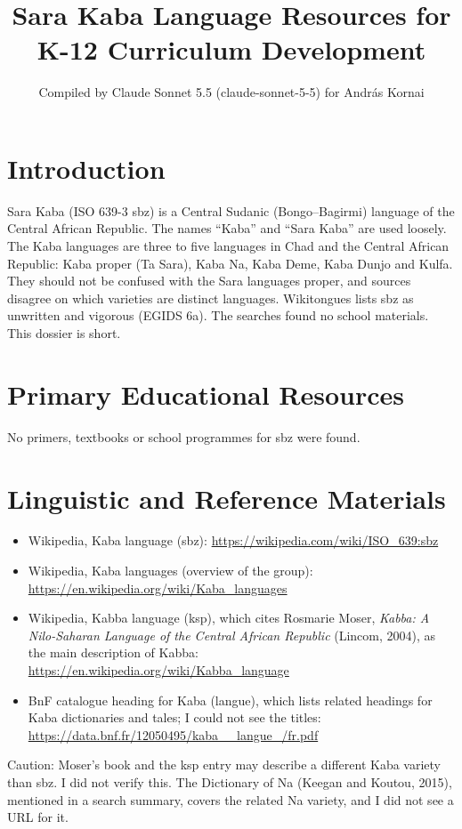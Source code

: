 \documentclass[12pt]{article}
\title{Sara Kaba Language Resources for K-12 Curriculum Development}
\author{Compiled by Claude Sonnet 5.5 (claude-sonnet-5-5) for Andr\'as Kornai}
\date{}
\begin{document}
\maketitle

\section{Introduction}
Sara Kaba (ISO 639-3 sbz) is a Central Sudanic (Bongo--Bagirmi) language of the Central African Republic. The names ``Kaba'' and ``Sara Kaba'' are used loosely. The Kaba languages are three to five languages in Chad and the Central African Republic: Kaba proper (Ta Sara), Kaba Na, Kaba Deme, Kaba Dunjo and Kulfa. They should not be confused with the Sara languages proper, and sources disagree on which varieties are distinct languages. Wikitongues lists sbz as unwritten and vigorous (EGIDS 6a). The searches found no school materials. This dossier is short.

\section{Primary Educational Resources}
No primers, textbooks or school programmes for sbz were found.

\section{Linguistic and Reference Materials}
\begin{itemize}
\item Wikipedia, Kaba language (sbz): \url{https://wikipedia.com/wiki/ISO_639:sbz}
\item Wikipedia, Kaba languages (overview of the group): \url{https://en.wikipedia.org/wiki/Kaba_languages}
\item Wikipedia, Kabba language (ksp), which cites Rosmarie Moser, \emph{Kabba: A Nilo-Saharan Language of the Central African Republic} (Lincom, 2004), as the main description of Kabba: \url{https://en.wikipedia.org/wiki/Kabba_language}
\item BnF catalogue heading for Kaba (langue), which lists related headings for Kaba dictionaries and tales; I could not see the titles: \url{https://data.bnf.fr/12050495/kaba__langue_/fr.pdf}
\end{itemize}
Caution: Moser's book and the ksp entry may describe a different Kaba variety than sbz. I did not verify this. The Dictionary of Na (Keegan and Koutou, 2015), mentioned in a search summary, covers the related Na variety, and I did not see a URL for it.
\end{document}
